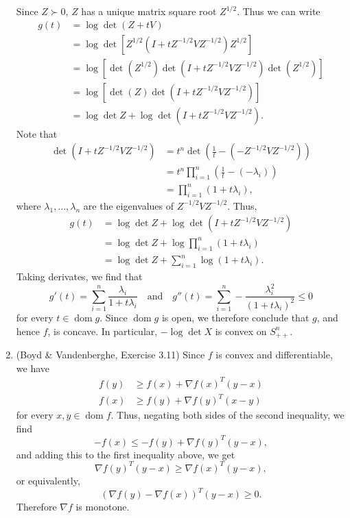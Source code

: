 \documentclass[letterpaper,12pt]{article}
\DeclareMathOperator{\dom}{dom}
\begin{document}
\begin{enumerate}
  Since $Z \succ 0$, $Z$ has a unique matrix square root
  $Z^{1/2}$. Thus we can write
  \begin{align*}
    g(t) &= \log \det(Z + tV) \\
      &= \log \det[Z^{1/2}(I + tZ^{-1/2}VZ^{-1/2})Z^{1/2}] \\
      &= \log [\det(Z^{1/2}) \det(I + tZ^{-1/2}VZ^{-1/2}) \det(Z^{1/2})] \\
      &= \log [\det(Z) \det(I + tZ^{-1/2}VZ^{-1/2})] \\
      &= \log \det Z + \log \det(I + tZ^{-1/2}VZ^{-1/2}).
  \end{align*}
  Note that
  \begin{align*}
    \det(I + tZ^{-1/2}VZ^{-1/2})
      &= t^n \det \left ( \frac{1}{t} - (-Z^{-1/2}VZ^{-1/2}) \right ) \\
      &= t^n \prod_{i=1}^n \left ( \frac{1}{t} - (- \lambda_i) \right ) \\
      &= \prod_{i=1}^n (1 + t\lambda_i),
  \end{align*}
  where $\lambda_1, \ldots, \lambda_n$ are the eigenvalues of
  $Z^{-1/2}VZ^{-1/2}$. Thus,
  \begin{align*}
    g(t) &= \log \det Z + \log \det(I + tZ^{-1/2}VZ^{-1/2}) \\
      &= \log \det Z + \log \prod_{i=1}^n (1 + t\lambda_i) \\
      &= \log \det Z + \sum_{i=1}^n \log(1 + t\lambda_i).
  \end{align*}
  Taking derivates, we find that
  \begin{equation*}
    g'(t) = \sum_{i=1}^n \frac{\lambda_i}{1 + t\lambda_i}
    \quad \text{and} \quad
    g''(t) = \sum_{i=1}^n -\frac{\lambda_i^2}{(1 + t\lambda_i)^2} \leq 0
  \end{equation*}
  for every $t \in \dom g$. Since $\dom g$ is open, we therefore
  conclude that $g$, and hence $f$, is concave. In particular,
  $-\log \det X$ is convex on $S^n_{++}$.

\item (Boyd \& Vandenberghe, Exercise 3.11) Since $f$ is convex and
  differentiable, we have
  \begin{align*}
    f(y) &\geq f(x) + \nabla f(x)^T (y - x) \\
    f(x) &\geq f(y) + \nabla f(y)^T (x - y)
  \end{align*}
  for every $x, y \in \dom f$. Thus, negating both sides of the second
  inequality, we find
  \begin{equation*}
    -f(x) \leq -f(y) + \nabla f(y)^T (y - x),
  \end{equation*}
  and adding this to the first inequality above, we get
  \begin{equation*}
    \nabla f(y)^T (y - x) \geq \nabla f(x)^T (y - x),
  \end{equation*}
  or equivalently,
  \begin{equation*}
    (\nabla f(y) - \nabla f(x))^T (y - x) \geq 0.
  \end{equation*}
  Therefore $\nabla f$ is monotone.


\end{enumerate}
\end{document}
